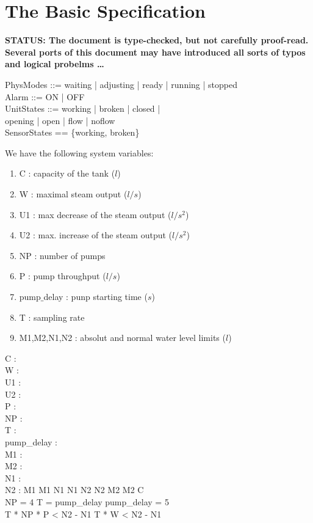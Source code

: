 \section{The Basic Specification}

\textbf{STATUS: The document is type-checked, but not carefully
  proof-read. Several ports of this document may have introduced
  all sorts of typos and logical probelms \ldots }


\begin{zed}
   PhysModes     ::= waiting | adjusting | ready | running | stopped \\
   Alarm         ::= ON | OFF \\
   UnitStates    ::= working | broken | closed  | \\
                     opening  | open  | flow  | noflow \\
   SensorStates == \{working, broken\}
\end{zed}

We have the following system variables:
\begin{enumerate}
\item  C           : capacity of the tank  ($l$)
\item  W           : maximal steam output  ($l/s$)
\item  U1          : max decrease of the steam output ($l/s^2$)
\item  U2          : max. increase of the steam output ($l/s^2$)
\item  NP          : number of pumps
\item  P           : pump throughput ($l/s$)
\item  pump$\_$delay : punp starting time ($s$)
\item  T           : sampling rate
\item  M1,M2,N1,N2 : absolut and normal water level limits ($l$)
\end{enumerate}


\begin{axdef}
    C   : \nat \\
    W   : \nat \\
    U1  : \nat \\
    U2  : \nat \\
    P   : \nat \\
    NP  : \nat \\
    T   : \nat \\
    pump\_delay : \nat \\
    M1  : \nat \\
    M2  : \nat \\
    N1  : \nat \\
    N2  : \nat 
  \leq M1 \land  M1 \leq N1 \land N1 \leq N2 \land  N2 \leq  M2 \land  M2 \leq  C \\  
    NP = 4 \land  T = pump\_delay \land  pump\_delay = 5 \\
    T * NP * P < N2 - N1 \land T * W < N2 - N1
\end{axdef}


